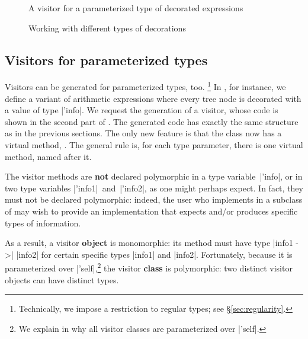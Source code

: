\documentclass[11pt,a4paper,twoside]{article}
\renewcommand{\emph}[1]{\textbf{#1}}
\begin{document}

\begin{figure}[p]
\vspace{-\baselineskip}
\caption{A visitor for a parameterized type of decorated expressions}
\label{fig:expr09}
\end{figure}

\begin{figure}[p]
\caption{Working with different types of decorations}
\label{fig:expr10}
\end{figure}

\subsection{Visitors for parameterized types}
\label{sec:intro:parameterized}

Visitors can be generated for parameterized types, too.%
%
\footnote{Technically, we impose a restriction to regular types; see
  \S\ref{sec:regularity}.}
%
In , for instance, we define a variant of arithmetic
expressions where every tree node is decorated with a value of type
\oc|'info|. We request the generation of a \map visitor, whose code is shown
in the second part of . The generated code has exactly the
same structure as in the previous sections. The only new feature is that the
class \map now has a virtual method, . The general rule
is, for each type parameter, there is one virtual method, named after it.

The visitor methods are \emph{not} declared polymorphic in a type
variable~\oc|'info|, or in two type variables \oc|'info1|~and~\oc|'info2|, as
one might perhaps expect. In fact, they must not be declared polymorphic:
indeed, the user who implements  in a subclass of \map may
wish to provide an implementation that expects and/or produces specific types
of information.

As a result, a visitor \emph{object} is monomorphic: its method
 must have type \oc|info1 ->| \oc|info2| for certain
specific types \oc|info1| and \oc|info2|. Fortunately, because it is
parameterized over \oc|'self|,\footnote{We explain in  why
  all visitor classes are parameterized over \oc|'self|.} the visitor
\emph{class} is polymorphic: two distinct visitor objects can have distinct
types.
\end{document}
